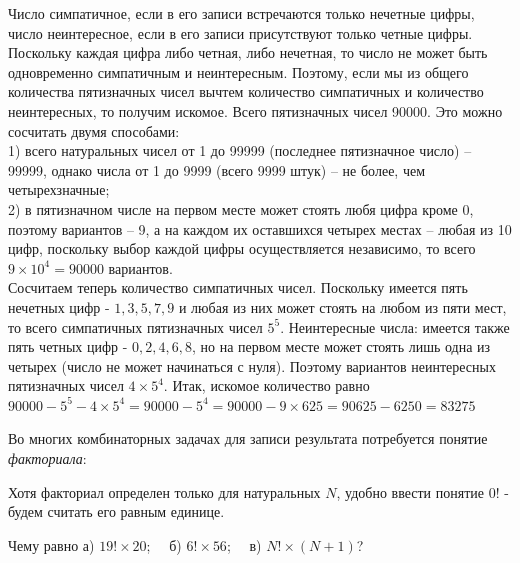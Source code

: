 \begin{prf}
	Число симпатичное, если в его записи встречаются только нечетные цифры, число неинтересное, если в его записи присутствуют только четные цифры. Поскольку каждая цифра либо четная, либо нечетная, то число не может быть одновременно симпатичным и неинтересным. Поэтому, если мы из общего количества пятизначных чисел вычтем количество симпатичных и количество неинтересных, то получим искомое.
	Всего пятизначных чисел 90000. Это можно сосчитать двумя способами:\\ 1) всего натуральных чисел от 1 до 99999 (последнее пятизначное число) -- 99999, однако числа от 1 до 9999 (всего 9999 штук) -- не более, чем четырехзначные;\\ 2) в пятизначном числе на первом месте может стоять любя цифра кроме 0, поэтому вариантов -- 9, а на каждом их оставшихся четырех местах -- любая из 10 цифр, поскольку выбор каждой цифры осуществляется независимо, то всего $9\times10^4 = 90000$ вариантов.\\
	Сосчитаем теперь количество симпатичных чисел. Поскольку имеется пять нечетных цифр - $1, 3, 5, 7, 9$ и любая из них может стоять на любом из пяти мест, то всего симпатичных пятизначных чисел $5^5$.
	Неинтересные числа: имеется также пять четных цифр - $0, 2, 4, 6, 8$, но на первом месте может стоять лишь одна из четырех (число не может начинаться с нуля). Поэтому вариантов неинтересных пятизначных чисел $4\times 5^4$.
	Итак, искомое количество равно\\ $ 90000 - 5^5 - 4\times 5^4 = 90000 - 5^4 = 90000 - 9\times625 = 90625 - 6250 = 83275 $
\end{prf}

Во многих комбинаторных задачах для записи результата потребуется понятие \textit{факториала}:


Хотя факториал определен только для натуральных $N$, удобно ввести понятие $0!$ - будем считать его равным единице.

\begin{ex}\label{u19}
	Чему равно а) $19!\times20$;~~  б) $6!\times56$;~~  в) $N!\times(N + 1)$?
\end{ex}

